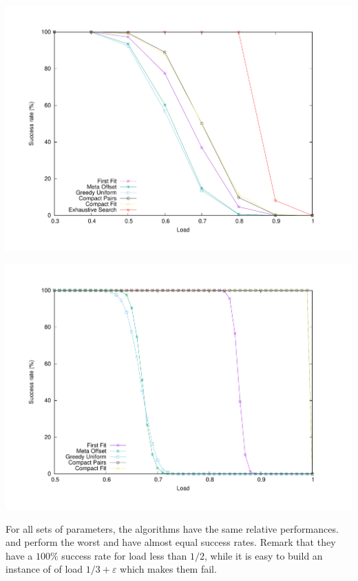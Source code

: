 \documentclass[pdflatex,sn-mathphys,iicol]{sn-jnl}%
\theoremstyle{thmstyleone}%
\theoremstyle{thmstyletwo}%
\theoremstyle{thmstylethree}%
\begin{document}
\begin{center}
\includegraphics[scale=0.275]{10mess}
\end{center}
\label{fig:10mess}

\begin{center}
\includegraphics[scale=0.275]{routestau}
\end{center}
\label{fig:shortroutes}

\medskip

For all sets of parameters, the algorithms have the same relative performances. \metaoffset and \greedyuniform perform the worst and have almost equal success rates. Remark that they have a $100\%$ success rate for load less than $1/2$, while it is easy to build an instance of \pma of load $1/3 +\varepsilon$ which makes them fail. 
\end{document}

